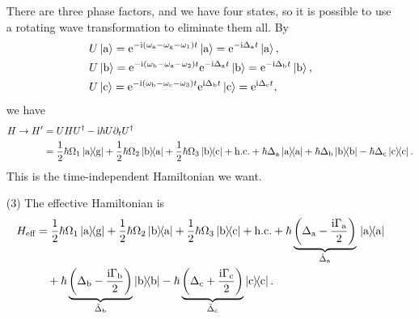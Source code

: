 \documentclass[hyperref, a4paper]{article}
\newcommand*{\ii}{\mathrm{i}}
\newcommand*{\ee}{\mathrm{e}}
\begin{document}
\begin{itemize}
There are three phase factors, and we have four states, so it is possible to use a rotating wave transformation to 
eliminate them all. By  
\begin{equation}
    \begin{aligned}
        &U \ket*{\text{a}} = \ee^{- \ii (\omega_\text{a} - \omega_\text{g} - \omega_1) t} \ket*{\text{a}} = \ee^{ - \ii \Delta_\text{a} t} \ket*{\text{a}}  , \\
        &U \ket*{\text{b}} = \ee^{- \ii (\omega_\text{b} - \omega_\text{a} - \omega_2 ) t} \ee^{ - \ii \Delta_\text{a} t}  \ket*{\text{b}} = \ee^{- \ii \Delta_\text{b} t} \ket*{\text{b}}, \\
        &U \ket*{\text{c}} = \ee^{- \ii (\omega_\text{b} - \omega_\text{c} - \omega_3) t} \ee^{ \ii \Delta_\text{b} t} \ket*{\text{c}} = \ee^{\ii \Delta_\text{c} t},
    \end{aligned}
\end{equation}
we have 
\begin{equation}
    \begin{aligned}
        H \to H' &= U H U^\dagger - \ii \hbar U \partial_t U^\dagger \\
        &= \frac{1}{2} \hbar \Omega_1 \dyad*{\text{a}}{\text{g}} + \frac{1}{2} \hbar \Omega_2 \dyad*{\text{b}}{\text{a}} + \frac{1}{2} \hbar \Omega_3  \dyad*{\text{b}}{\text{c}} + \text{h.c.} + \hbar \Delta_\text{a} \dyad*{\text{a}} + \hbar \Delta_\text{b} \dyad{\text{b}} - \hbar \Delta_\text{c} \dyad{\text{c}}.
    \end{aligned}
\end{equation}
This is the time-independent Hamiltonian we want.
\item[(3)] The effective Hamiltonian is 
\begin{equation}
    \begin{aligned}
        H_\text{eff}& = \frac{1}{2} \hbar \Omega_1 \dyad*{\text{a}}{\text{g}} + \frac{1}{2} \hbar \Omega_2 \dyad*{\text{b}}{\text{a}} + \frac{1}{2} \hbar \Omega_3  \dyad*{\text{b}}{\text{c}} + \text{h.c.} + \hbar \underbrace{\left( \Delta_\text{a} - \frac{\ii \Gamma_\text{a}}{2} \right)}_{\tilde{\Delta}_\text{a}} \dyad*{\text{a}} \\
        &\quad + \hbar \underbrace{\left( \Delta_\text{b} - \frac{\ii \Gamma_\text{b}}{2} \right)}_{\tilde{\Delta}_\text{b}} \dyad{\text{b}} - \hbar \underbrace{\left( \Delta_\text{c} + \frac{\ii \Gamma_\text{c}}{2} \right)}_{\tilde{\Delta}_\text{c}} \dyad{\text{c}} .
    \end{aligned}
\end{equation} 


\end{itemize}
\end{document}
